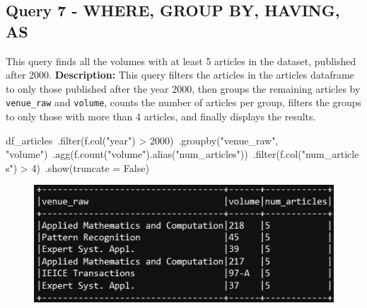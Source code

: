 \documentclass{Configuration_Files/PoliMi3i_thesis}
\begin{document}
\subsection{Query 7 - WHERE, GROUP BY, HAVING, AS}
This query finds all the volumes with at least 5 articles in the dataset, published after 2000.\newline
\textbf{Description:} This query filters the articles in the articles dataframe to only those published after the year 2000,
then groups the remaining articles by \verb|venue_raw| and \verb|volume|, counts the number of articles per group, filters the
groups to only those with more than 4 articles, and finally displays the results.\newline
\begin{python}
df_articles\
    .filter(f.col("year") > 2000)\
    .groupby("venue_raw", "volume")\
    .agg(f.count("volume").alias("num_articles"))\
    .filter(f.col("num_articles") > 4)\
    .show(truncate = False)
\end{python}
\begin{figure}[H]
\centering
\includegraphics[width=1\textwidth]{query/spark_q7.PNG}
\label{fig:query7}
\end{figure}
\end{document}
